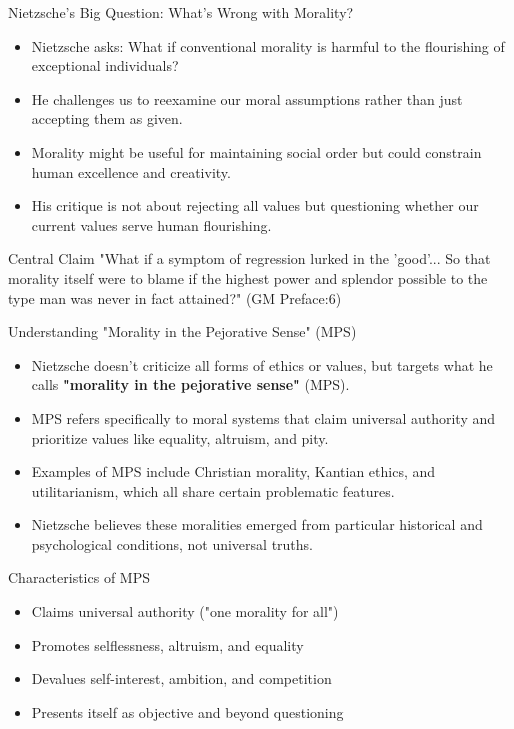 \documentclass{beamer}
\begin{document}
\begin{frame}{Nietzsche's Big Question: What's Wrong with Morality?}
\begin{itemize}
\item Nietzsche asks: What if conventional morality is harmful to the flourishing of exceptional individuals?
\item He challenges us to reexamine our moral assumptions rather than just accepting them as given.
\item Morality might be useful for maintaining social order but could constrain human excellence and creativity.
\item His critique is not about rejecting all values but questioning whether our current values serve human flourishing.
\end{itemize}

\begin{alertblock}{Central Claim}
"What if a symptom of regression lurked in the 'good'... So that morality itself were to blame if the highest power and splendor possible to the type man was never in fact attained?" (GM Preface:6)
\end{alertblock}
\end{frame}

\begin{frame}{Understanding "Morality in the Pejorative Sense" (MPS)}
\begin{itemize}
\item Nietzsche doesn't criticize all forms of ethics or values, but targets what he calls \textbf{"morality in the pejorative sense"} (MPS).
\item MPS refers specifically to moral systems that claim universal authority and prioritize values like equality, altruism, and pity.
\item Examples of MPS include Christian morality, Kantian ethics, and utilitarianism, which all share certain problematic features.
\item Nietzsche believes these moralities emerged from particular historical and psychological conditions, not universal truths.
\end{itemize}

\begin{block}{Characteristics of MPS}
\begin{itemize}
\item Claims universal authority ("one morality for all")
\item Promotes selflessness, altruism, and equality
\item Devalues self-interest, ambition, and competition
\item Presents itself as objective and beyond questioning
\end{itemize}
\end{block}
\end{frame}
    
\end{document}
